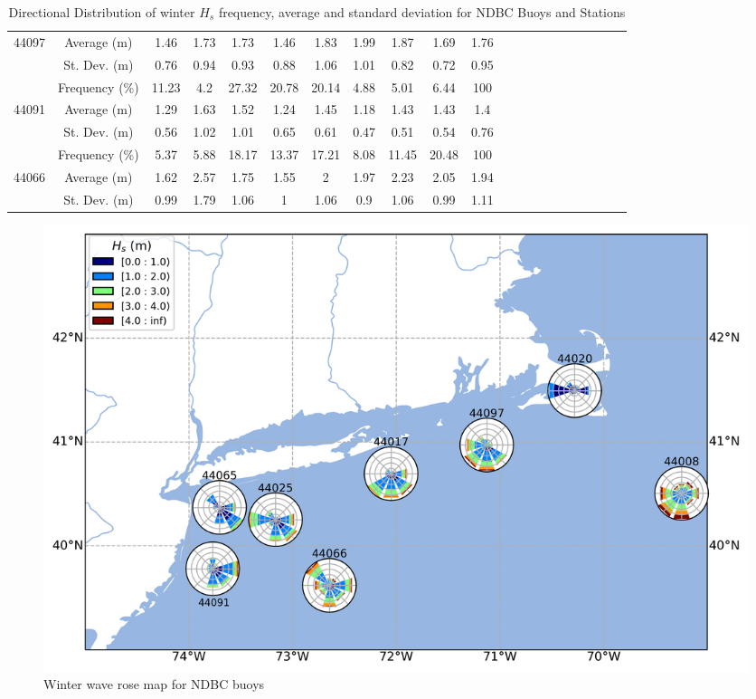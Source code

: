 \begin{table}[H]
\begin{tabular*}{\textwidth}{c@{\hskip 0.07in}cccccccccc @{\extracolsep{\fill}} cccccccccc}
    44097 & Average (m)   & 1.46  & 1.73 & 1.73  & 1.46  & 1.83  & 1.99  & 1.87  & 1.69  & 1.76 \\
    ~     & St. Dev. (m)  & 0.76  & 0.94 & 0.93  & 0.88  & 1.06  & 1.01  & 0.82  & 0.72  & 0.95 \\ \midrule
    ~     & Frequency (\%)  & 11.23 & 4.2  & 27.32 & 20.78 & 20.14 & 4.88  & 5.01  & 6.44  & 100  \\
    44091 & Average (m)   & 1.29  & 1.63 & 1.52  & 1.24  & 1.45  & 1.18  & 1.43  & 1.43  & 1.4  \\
    ~     & St. Dev. (m)  & 0.56  & 1.02 & 1.01  & 0.65  & 0.61  & 0.47  & 0.51  & 0.54  & 0.76 \\ \midrule
    ~     & Frequency (\%)  & 5.37  & 5.88 & 18.17 & 13.37 & 17.21 & 8.08  & 11.45 & 20.48 & 100  \\
    44066 & Average (m)   & 1.62  & 2.57 & 1.75  & 1.55  & 2     & 1.97  & 2.23  & 2.05  & 1.94 \\
    ~     & St. Dev. (m)  & 0.99  & 1.79 & 1.06  & 1     & 1.06  & 0.9   & 1.06  & 0.99  & 1.11 \\ \bottomrule
\end{tabular*}
\caption {Directional Distribution of winter $H_{s}$ frequency, average and standard deviation for NDBC Buoys and Stations}
\label{tab:wave_distribution_winter}
\end{table}


\begin{figure}[H]
\centering
\includegraphics[width=0.81\linewidth]{Figures/Chapter5/waverose_map_winter.png}
\caption{Winter wave rose map for NDBC buoys}
\label{fig:waverose_map_winter}
\end{figure}



